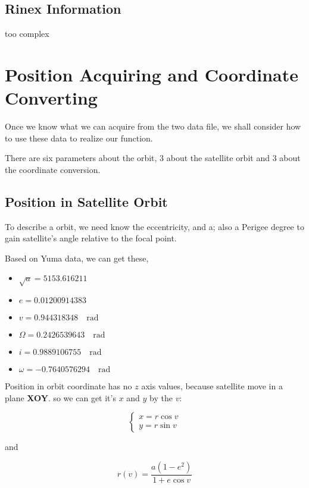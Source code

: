 \documentclass[conference]{IEEEtran}
\begin{document}
\subsection{Rinex Information}

too complex


\section{Position Acquiring and Coordinate Converting}

Once we know what we can acquire from the two data file, we shall consider how to use these data to realize our function.

There are six parameters about the orbit, 3 about the satellite orbit and 3 about the coordinate conversion.

\subsection{Position in Satellite Orbit}

To describe a orbit, we need know the eccentricity, and a; also a Perigee degree to gain satellite's angle relative to the focal point.

Based on Yuma data, we can get these,
\begin{itemize}
	\item $\sqrt{a}=5153.616211$
	\item $e=0.01200914383$
	\item $v=0.944318348 \quad \text{rad}$
	\item $\Omega = 0.2426539643 \quad \text{rad}$
	\item $i = 0.9889106755 \quad \text{rad}$
	\item $\omega =  -0.7640576294 \quad \text{rad}$
\end{itemize}

Position in orbit coordinate has no $z$ axis values, because satellite move in a plane \textbf{XOY}. so we can get it's $x$ and $y$ by the $v$:

\begin{equation}
	\begin{cases}
	x = r \cos v\\
	y = r \sin v
	\end{cases}
\end{equation}

and

\begin{equation}
r(v)=\frac{a(1-e^2)}{1+e\cos v}
\end{equation}
\end{document}
